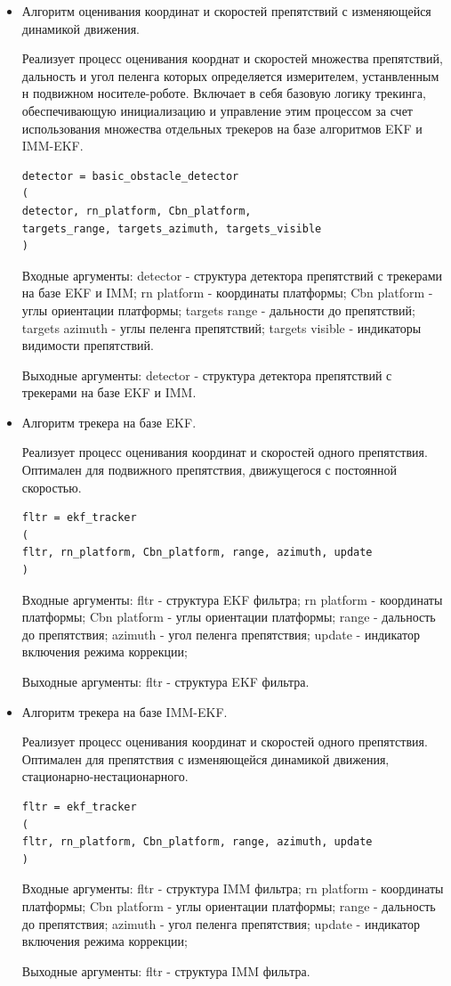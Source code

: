 \documentclass[14pt]{article}
\begin{document}
\begin{itemize}
\item Алгоритм оценивания координат и скоростей препятствий с изменяющейся динамикой движения.

Реализует процесс оценивания коорднат и скоростей множества препятствий, дальность и угол пеленга которых определяется измерителем, устанвленным н подвижном носителе-роботе. Включает в себя базовую логику трекинга, обеспечивающую инициализацию и управление этим процессом за счет использования множества отдельных трекеров на базе алгоритмов EKF и IMM-EKF.

\begin{verbatim}
detector = basic_obstacle_detector
(
detector, rn_platform, Cbn_platform,
targets_range, targets_azimuth, targets_visible
)
\end{verbatim}

Входные аргументы:  detector - структура детектора препятствий с трекерами на базе EKF и IMM; rn platform -  координаты платформы; Cbn platform - углы ориентации платформы;
targets range - дальности до препятствий; targets azimuth - углы пеленга препятствий; targets visible - индикаторы видимости препятствий.

Выходные аргументы: detector - структура детектора препятствий с трекерами на базе EKF и IMM. 

\item Алгоритм трекера на базе EKF.

Реализует процесс оценивания координат и скоростей одного препятствия. Оптимален для подвижного препятствия, движущегося с постоянной скоростью. 

\begin{verbatim}
fltr = ekf_tracker
(
fltr, rn_platform, Cbn_platform, range, azimuth, update
)
\end{verbatim}

 Входные аргументы: fltr - структура EKF фильтра; rn platform -  координаты платформы; Cbn platform - углы ориентации платформы; range - дальность до препятствия;
azimuth - угол пеленга препятствия; update - индикатор включения режима коррекции;

Выходные аргументы: fltr - структура EKF фильтра.

\item Алгоритм трекера на базе IMM-EKF.

Реализует процесс оценивания координат и скоростей одного препятствия. Оптимален для  препятствия с изменяющейся динамикой движения, стационарно-нестационарного.

\begin{verbatim}
fltr = ekf_tracker
(
fltr, rn_platform, Cbn_platform, range, azimuth, update
)
\end{verbatim}

 Входные аргументы: fltr - структура IMM фильтра; rn platform -  координаты платформы; Cbn platform - углы ориентации платформы; range - дальность до препятствия;
azimuth - угол пеленга препятствия; update - индикатор включения режима коррекции;

Выходные аргументы: fltr - структура IMM фильтра.
 

\end{itemize}
\end{document}
